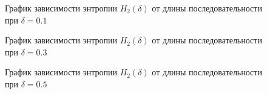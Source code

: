 \documentclass[a4paper,12pt]{article}
\theoremstyle{plain}
\begin{document}
\vspace*{1cm}
	\begin{figure}[h]
		\caption{График зависимости энтропии $H_2{(\delta)}$ от длины последовательности при  $\delta = 0.1$}
		\label{ris:"h2_01.png"}
	\end{figure}
	\begin{figure}[h]
		\caption{График зависимости энтропии $H_2{(\delta)}$ от длины последовательности при  $\delta = 0.3$}
		\label{ris:"h2_03.png"}
	\end{figure}
		\begin{figure}[h]
			\caption{График зависимости энтропии $H_2{(\delta)}$ от длины последовательности при  $\delta = 0.5$}
			\label{ris:"h2_05.png"}
		\end{figure}
\end{document}
